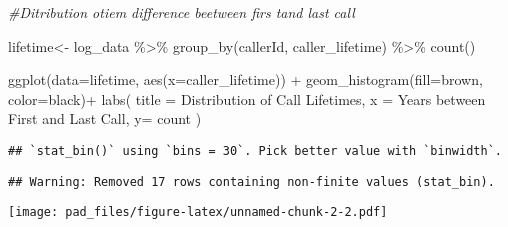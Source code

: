 \documentclass[
]{article}
\newenvironment{Shaded}{\begin{snugshade}}{\end{snugshade}}
\newcommand{\AttributeTok}[1]{\textcolor[rgb]{0.77,0.63,0.00}{#1}}
\newcommand{\CommentTok}[1]{\textcolor[rgb]{0.56,0.35,0.01}{\textit{#1}}}
\newcommand{\FunctionTok}[1]{\textcolor[rgb]{0.00,0.00,0.00}{#1}}
\newcommand{\NormalTok}[1]{#1}
\newcommand{\OtherTok}[1]{\textcolor[rgb]{0.56,0.35,0.01}{#1}}
\newcommand{\SpecialCharTok}[1]{\textcolor[rgb]{0.00,0.00,0.00}{#1}}
\newcommand{\StringTok}[1]{\textcolor[rgb]{0.31,0.60,0.02}{#1}}
\begin{document}
\begin{Shaded}
\begin{Highlighting}[]
\CommentTok{\#Ditribution otiem difference beetween firs tand last call}

\NormalTok{lifetime}\OtherTok{\textless{}{-}}\NormalTok{ log\_data }\SpecialCharTok{\%\textgreater{}\%}
  \FunctionTok{group\_by}\NormalTok{(callerId, caller\_lifetime) }\SpecialCharTok{\%\textgreater{}\%}
  \FunctionTok{count}\NormalTok{()}

\FunctionTok{ggplot}\NormalTok{(}\AttributeTok{data=}\NormalTok{lifetime, }\FunctionTok{aes}\NormalTok{(}\AttributeTok{x=}\NormalTok{caller\_lifetime)) }\SpecialCharTok{+}
  \FunctionTok{geom\_histogram}\NormalTok{(}\AttributeTok{fill=}\StringTok{\textquotesingle{}brown\textquotesingle{}}\NormalTok{, }\AttributeTok{color=}\StringTok{\textquotesingle{}black\textquotesingle{}}\NormalTok{)}\SpecialCharTok{+}
  \FunctionTok{labs}\NormalTok{(}
    \AttributeTok{title =} \StringTok{\textquotesingle{}Distribution of Call Lifetimes\textquotesingle{}}\NormalTok{,}
    \AttributeTok{x =} \StringTok{\textquotesingle{}Years between First and Last Call\textquotesingle{}}\NormalTok{,}
    \AttributeTok{y=} \StringTok{\textquotesingle{}count\textquotesingle{}}
\NormalTok{  )}
\end{Highlighting}
\end{Shaded}

\begin{verbatim}
## `stat_bin()` using `bins = 30`. Pick better value with `binwidth`.
\end{verbatim}

\begin{verbatim}
## Warning: Removed 17 rows containing non-finite values (stat_bin).
\end{verbatim}

\texttt{[image: pad\_files/figure-latex/unnamed-chunk-2-2.pdf]}
\end{document}
